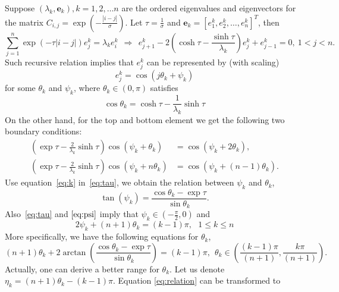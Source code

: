 \documentclass[11pt]{amsart}
\newcommand{\be}{\mathbf{e}}
\begin{document}
Suppose $(\lambda_k, \be_k), k=1, 2, \dots n$ are the ordered eigenvalues and eigenvectors for the matrix $C_{i,j}=\exp(-\frac{|i-j|}{\sigma})$. Let $\tau=\frac{1}{\sigma}$ and $\be_k=[e_1^k, e_2^k, \ldots, e_{n}^k]^T$, then 
\begin{equation}
\sum_{j=1}^n \exp(-\tau|i-j|)e_j^k=\lambda_k e_i^k ~~ \Rightarrow ~~ e^k_{j+1}-2(\cosh \tau-\frac{\sinh\tau}{\lambda_k} )e^k_j+e^k_{j-1}=0,  ~1<j<n.
\end{equation}
Such recursive relation implies that $e^k_j$ can be represented by (with scaling)
	\begin{equation}
	e^k_j= \cos(j \theta_k + \psi_k)
	\end{equation}
for some $\theta_k$ and $\psi_k$, where $\theta_k\in(0, \pi)$ satisfies 
	\begin{equation}\label{eq:k}
	\cos\theta_k = \cosh \tau - \frac{1}{\lambda_k}\sinh\tau
	\end{equation}
On the other hand, for the top and bottom element we get the following two boundary conditions:
	\begin{equation}\label{eq:tau}
	\begin{aligned}
	(\exp\tau - \frac{2}{\lambda_k}\sinh\tau) \cos(\psi_k + \theta_k) &= \cos(\psi_k + 2\theta_k),\\
	(\exp\tau - \frac{2}{\lambda_k}\sinh\tau) \cos(\psi_k + n\theta_k) &= \cos(\psi_k + (n-1)\theta_k).
	\end{aligned}
	\end{equation}
Use equation~\eqref{eq:k} in~\eqref{eq:tau}, we obtain the relation between $\psi_k$ and $\theta_k$,
	\begin{equation}\label{eq:psi}
	\tan(\psi_k) = \frac{\cos\theta_k - \exp\tau }{\sin\theta_k}.
	\end{equation}
Also~\eqref{eq:tau} and $\eqref{eq:psi}$ imply that $\psi_k \in (-\frac{\pi}{2}, 0)$ and 
\begin{equation}
\label{eq:relation}
2\psi_k + (n+1)\theta_k = (k-1)\pi,~~~1\le k \le n
\end{equation}
 More specifically, we have the following equations for $\theta_k$, 
	\begin{equation}
	\label{eq:theta}
(n+1)\theta_k + 2\arctan\left(\frac{\cos\theta_k - \exp\tau}{\sin\theta_k}\right) = (k-1)\pi, ~~ \theta_k \in \left(\frac{(k-1)\pi}{(n+1)}, \frac{k\pi}{(n+1)}\right).
	\end{equation}
Actually, one can derive a better range for $\theta_k$. Let us denote $\eta_k = (n+1)\theta_k - (k-1)\pi$. Equation \eqref{eq:relation} can be transformed to
\end{document}
